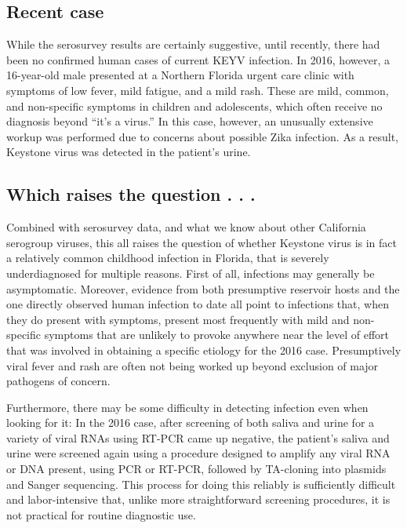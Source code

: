 \documentclass[12pt]{article}
\newcommand{\cjh}{\textcolor{blue}{cjh}}
\newcommand{\msg}[3]{(#1 $\rightarrow$ #2: #3)}
\newcommand{\mcc}[1]{\msg\cjh\cjh{#1}}
\begin{document}

        \subsection{Recent case}
            \label{recent-case}
            While the serosurvey results are certainly suggestive, until recently, there had been no confirmed human cases of current KEYV infection. In 2016, however, a 16-year-old male presented at a Northern Florida urgent care clinic with symptoms of low fever, mild fatigue, and a mild rash. These are mild, common, and non-specific symptoms in children and adolescents, which often receive no diagnosis beyond ``it's a virus.'' In this case, however, an unusually extensive workup was performed due to concerns about possible Zika infection. As a result, Keystone virus was detected in the patient's urine.\cite{lednicky2018keystone}
        

        \subsection{Which raises the question . . .}
            \label{raises-the-question}
            Combined with serosurvey data, and what we know about other California serogroup viruses, this all raises the question of whether Keystone virus is in fact a relatively common childhood infection in Florida, that is severely underdiagnosed for multiple reasons. First of all, infections may generally be asymptomatic. Moreover, evidence from both presumptive reservoir hosts and the one directly observed human infection to date all point to infections that, when they do present with symptoms, present most frequently with mild and non-specific symptoms that are unlikely to provoke anywhere near the level of effort that was involved in obtaining a specific etiology for the 2016 case. Presumptively viral fever and rash are often not being worked up beyond exclusion of major pathogens of concern.
        
            Furthermore, there may be some difficulty in detecting infection even when looking for it: In the 2016 case, after screening of both saliva and urine for a variety of viral RNAs using RT-PCR came up negative, the patient's saliva and urine were screened again using a procedure designed to amplify any viral RNA or DNA present, using PCR or RT-PCR, followed by TA-cloning into plasmids and Sanger sequencing\cite{lednicky2018keystone}. This process for doing this reliably is sufficiently difficult and labor-intensive that, unlike more straightforward screening procedures, it is not practical for routine diagnostic use.\cite{lednicky2019personal}
\end{document}
